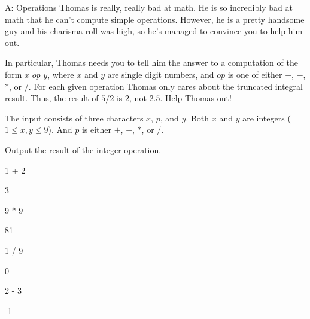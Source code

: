 \begin{problem}{A: Operations}
Thomas is really, really bad at math.
He is so incredibly bad at math that he can't compute simple operations.
However, he is a pretty handsome guy and his charisma roll was high, so he's managed to convince you to help him out.

In particular, Thomas needs you to tell him the answer to a computation of the form $x$ $op$ $y$, where $x$ and $y$ are single digit numbers, and ${op}$ is one of either $+$, $-$, $*$, or $/$.
For each given operation Thomas only cares about the truncated integral result.
Thus, the result of $5 / 2$ is $2$, not $2.5$.
Help Thomas out!
\end{problem}

\begin{formalin}
The input consists of three characters $x$, $p$, and $y$.
Both $x$ and $y$ are integers ($1 \leq x, y \leq 9$).
And $p$ is either $+$, $-$, $*$, or $/$.
\end{formalin}

\begin{formalout}
Output the result of the integer operation.
\end{formalout}

\begin{datain}
1 + 2
\end{datain}
\begin{dataout}
3
\end{dataout}

\begin{datain}
9 * 9
\end{datain}
\begin{dataout}
81
\end{dataout}

\begin{datain}
1 / 9
\end{datain}
\begin{dataout}
0
\end{dataout}

\begin{datain}
2 - 3
\end{datain}
\begin{dataout}
-1
\end{dataout}
